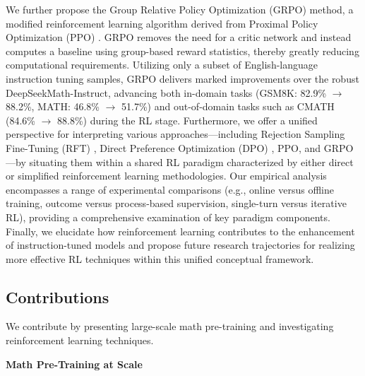 We further propose the Group Relative Policy Optimization (GRPO) method, a modified reinforcement learning algorithm derived from Proximal Policy Optimization (PPO) \citep{schulman2017proximal}. GRPO removes the need for a critic network and instead computes a baseline using group-based reward statistics, thereby greatly reducing computational requirements. Utilizing only a subset of English-language instruction tuning samples, GRPO delivers marked improvements over the robust DeepSeekMath-Instruct, advancing both in-domain tasks (GSM8K: 82.9\% $\rightarrow$ 88.2\%, MATH: 46.8\% $\rightarrow$ 51.7\%) and out-of-domain tasks such as CMATH (84.6\% $\rightarrow$ 88.8\%) during the RL stage. Furthermore, we offer a unified perspective for interpreting various approaches—including Rejection Sampling Fine-Tuning (RFT) \citep{yuan2023scaling}, Direct Preference Optimization (DPO) \citep{dpo}, PPO, and GRPO—by situating them within a shared RL paradigm characterized by either direct or simplified reinforcement learning methodologies. Our empirical analysis encompasses a range of experimental comparisons (e.g., online versus offline training, outcome versus process-based supervision, single-turn versus iterative RL), providing a comprehensive examination of key paradigm components. Finally, we elucidate how reinforcement learning contributes to the enhancement of instruction-tuned models and propose future research trajectories for realizing more effective RL techniques within this unified conceptual framework.

\subsection{Contributions}
We contribute by presenting large-scale math pre-training and investigating reinforcement learning techniques.

\textbf{Math Pre-Training at Scale}

